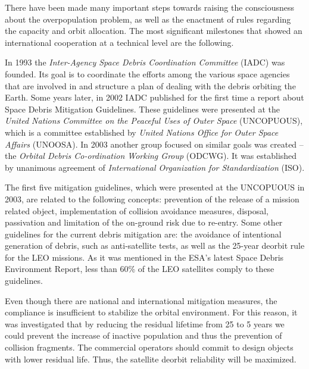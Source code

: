 \bigskip
There have been made many important steps towards raising the consciousness about the overpopulation problem, as well as the enactment of rules regarding the capacity and orbit allocation. The most significant milestones that showed an international cooperation at a technical level are the following.

In 1993 the \textit{Inter-Agency Space Debris Coordination Committee} (IADC) was founded. Its goal is to coordinate the efforts among the various space agencies that are involved in and structure a plan of dealing with the debris orbiting the Earth. Some years later, in 2002 IADC published for the first time a report about Space Debris Mitigation Guidelines. \cite{UNOOSA} %
These guidelines were presented at the \textit{United Nations Committee on the Peaceful Uses of Outer Space} (UNCOPUOUS), which is a committee established by \textit{United Nations Office for Outer Space Affairs} (UNOOSA). \cite{IADC 2007} In 2003 another group focused on similar goals was created – the \textit{Orbital Debris Co-ordination Working Group} (ODCWG). It was established by unanimous agreement of \textit{International Organization for Standardization} (ISO). \cite{Klinkrad 2006}

The first five mitigation guidelines, which were presented at the UNCOPUOUS in 2003, are related to the following concepts: prevention of the release of a mission related object, implementation of collision avoidance measures, disposal, passivation and limitation of the on-ground risk due to re-entry. Some other guidelines for the current debris mitigation are: the avoidance of intentional generation of debris, such as anti-satellite tests, as well as the 25-year deorbit rule for the LEO missions. As it was mentioned in the ESA's latest Space Debris Environment Report, less than 60\% of the LEO satellites comply to these guidelines. \cite{ESA 2019} %

Even though there are national and international mitigation measures, the compliance is insufficient to stabilize the orbital environment. For this reason, it was investigated that by reducing the residual lifetime from 25 to 5 years we could prevent the increase of inactive population and thus the prevention of collision fragments. The commercial operators should commit to design objects with lower residual life. Thus, the satellite deorbit reliability will be maximized. \cite{Somma 2019}

